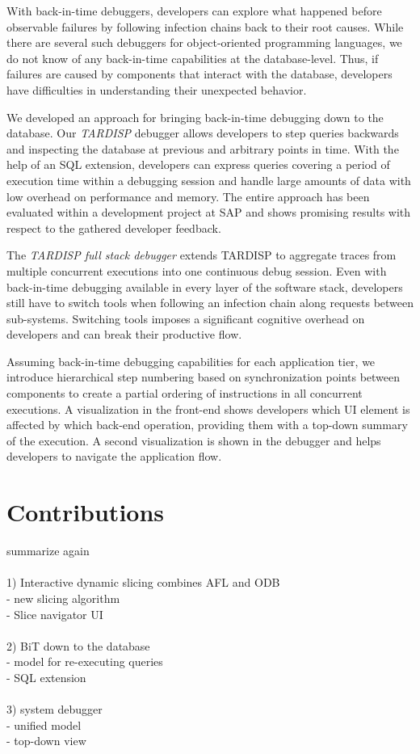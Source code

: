 With back-in-time debuggers, developers can explore what happened before observable failures by following infection chains back to their root causes. 
While there are several such debuggers for object-oriented programming languages, we do not know of any back-in-time capabilities at the database-level.
Thus, if failures are caused by components that interact with the database, developers have difficulties in understanding their unexpected behavior.

We developed an approach for bringing back-in-time debugging down to the database.
Our \emph{TARDISP} debugger allows developers to step queries backwards and inspecting the database at previous and arbitrary points in time. 
With the help of an SQL extension, developers can express queries covering a period of execution time within a debugging session and handle large amounts of data with low overhead on performance and memory. 
The entire approach has been evaluated within a development project at SAP and shows promising results with respect to the gathered developer feedback.


The \emph{TARDISP full stack debugger} extends TARDISP to aggregate traces from multiple concurrent executions into one continuous debug session.
Even with back-in-time debugging available in every layer of the software stack, developers still have to switch tools when following an infection chain along requests between sub-systems.
Switching tools imposes a significant cognitive overhead on developers and can break their productive flow.

Assuming back-in-time debugging capabilities for each application tier, 
we introduce hierarchical step numbering based on synchronization points between components to create a partial ordering of instructions in all concurrent executions.
A visualization in the front-end shows developers which UI element is affected by which back-end operation, providing them with a top-down summary of the execution.
A second visualization is shown in the debugger and helps developers to navigate the application flow.

\section{Contributions} 
summarize again \\ \\
1) Interactive dynamic slicing combines AFL and ODB \\
- new slicing algorithm \\
- Slice navigator UI\\
\\
2) BiT down to the database\\
- model for re-executing queries\\
- SQL extension\\
\\
3) system debugger\\
- unified model\\
- top-down view\\


